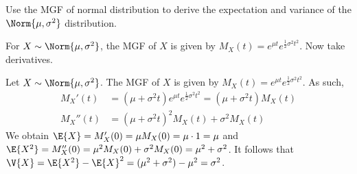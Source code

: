 	\begin{exercise}\label{ex:chap06:013}
		Use the MGF of normal distribution to derive the expectation and variance of the $\Norm{\mu,\sigma^2}$ distribution. 
		\begin{hint}
			For $X \sim \Norm{\mu, \sigma^2}$, the MGF of $X$ is given by $M_X(t) = e^{\mu t} e^{\frac{1}{2} \sigma^2 t^2}$. Now take derivatives.
		\end{hint}
		\begin{solution}
			Let $X \sim \Norm{\mu, \sigma^2}$. The MGF of $X$ is given by $M_X(t) = e^{\mu t} e^{\frac{1}{2} \sigma^2 t^2}$. As such,
			\begin{align*}
				M_X'(t) & = (\mu + \sigma^2 t) e^{\mu t} e^{\frac{1}{2} \sigma^2 t^2} = (\mu + \sigma^2 t) M_X(t) \\
				M_X''(t) & = (\mu + \sigma^2 t)^2 M_X(t) + \sigma^2 M_X(t)
			\end{align*}
			We obtain $\E{X} = M_X'(0) = \mu M_X(0) = \mu \cdot 1 = \mu$ and $\E{X^2} = M_X''(0) = \mu^2 M_X(0) + \sigma^2 M_X(0) = \mu^2 + \sigma^2$. It follows that $\V{X} = \E{X^2} - \E{X}^2 = (\mu^2 + \sigma^2) - \mu^2 = \sigma^2$.
		\end{solution}
	\end{exercise}
	
